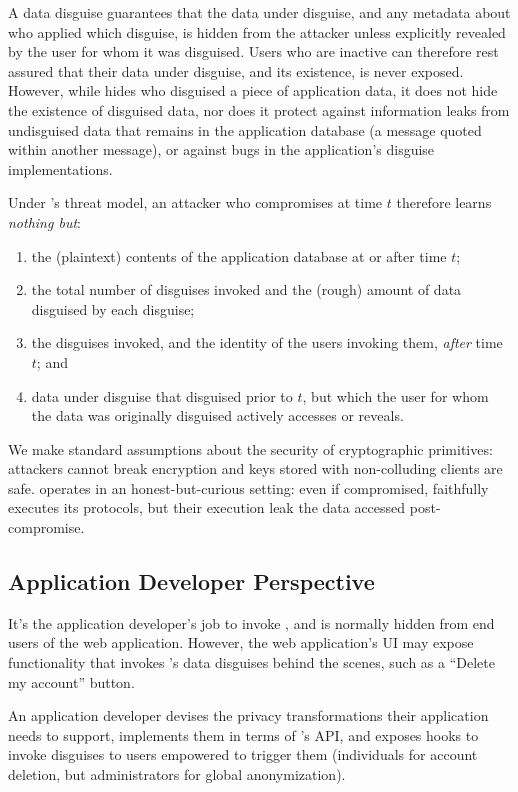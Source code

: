 %
A data disguise guarantees that the data under disguise, and any metadata about who
applied which disguise, is hidden from the attacker unless explicitly revealed by the
user for whom it was disguised.
%
Users who are inactive can therefore rest assured that their data under disguise, and
its existence, is never exposed.
%
However, while \sys hides who disguised a piece of application data, it does not hide
the existence of disguised data, nor does it protect against information leaks from
undisguised data that remains in the application database (\eg a message quoted
within another message), or against bugs in the application's disguise
implementations.
%

%
Under \sys's threat model, an attacker who compromises \sys at time $t$ therefore
learns \emph{nothing but}:
%
\begin{enumerate}[nosep]
  \item the (plaintext) contents of the application database at or after time $t$;
  \item the total number of disguises invoked and the (rough) amount of data
    disguised by each disguise;
  \item the disguises invoked, and the identity of the users invoking them,
    \emph{after} time $t$; and
  \item data under disguise that \sys disguised prior to $t$, but which
    the user for whom the data was originally disguised actively accesses or
    reveals.
\end{enumerate}
%
We make standard assumptions about the security of cryptographic primitives: attackers
cannot break encryption and keys stored with non-colluding clients are safe.
%
\sys operates in an honest-but-curious setting: even if compromised, \sys faithfully
executes its protocols, but their execution leak the data accessed post-compromise.
%


\subsection{Application Developer Perspective}
%
It's the application developer's job to invoke \sys, and \sys is normally
hidden from end users of the web application.
%
However, the web application's UI may expose functionality that invokes \sys's
data disguises behind the scenes, such as a ``Delete my account'' button.
%

%
An application developer devises the privacy transformations their application needs to
support, implements them in terms of \sys's API, and exposes hooks to invoke disguises to
users empowered to trigger them (\eg individuals for account deletion, but
administrators for global anonymization).
%

